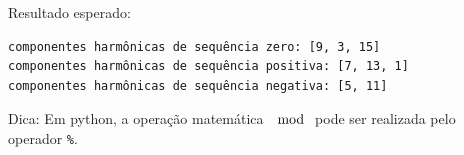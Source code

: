 Resultado esperado:
\begin{verbatim}
componentes harmônicas de sequência zero: [9, 3, 15]
componentes harmônicas de sequência positiva: [7, 13, 1]
componentes harmônicas de sequência negativa: [5, 11]
\end{verbatim}

Dica: Em python, a operação matemática $\mod$ pode ser realizada pelo operador \texttt{\%}.


